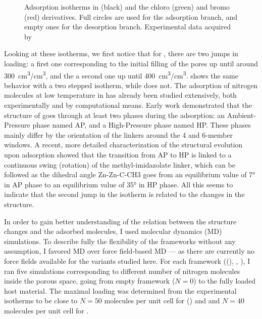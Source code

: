 \documentclass[thesis]{subfiles}
\begin{document}
\begin{figure}[ht]
    \centering
    
    \caption{Adsorption isotherms in  (black) and the chloro (green) and
    bromo (red) derivatives. Full circles are used for the adsorption branch,
    and empty ones for the desorption branch. Experimental data acquired by
    \citeauthor{Chaplais2018}\cite{Chaplais2018}}
    \label{fig:zif8x:isotherms}
\end{figure}

Looking at these isotherms, we first notice that for , there are two jumps
in loading: a first one corresponding to the initial filling of the pores up
until around \SI{300}{cm^3/cm^3}, and the a second one up until
\SI{400}{cm^3/cm^3}. \ZIFCl shows the same behavior with a two stepped isotherm,
while \ZIFBr does not. The adsorption of nitrogen molecules at low temperature
in  has already been studied extensively, both experimentally and by
computational means. Early work demonstrated that the structure of  goes
through at least two phases during the adsorption: an Ambient-Pressure phase
named AP, and a High-Pressure phase named HP. These phases mainly differ by the
orientation of the linkers around the 4 and 6-member
windows.\cite{FairenJimenez2011} A recent, more detailed characterization of the
structural evolution upon adsorption showed that the transition from AP to HP is
linked to a continuous swing (rotation) of the methyl-imidazolate linker, which
can be followed as the dihedral angle Zn-Zn-C-CH3 goes from an equilibrium value
of 7° in AP phase to an equilibrium value of 35° in HP phase.\cite{Coudert2017}
All this seems to indicate that the second jump in the isotherm is related to
the changes in the structure.

In order to gain better understanding of the relation between the structure
changes and the adsorbed molecules, I used molecular dynamics (MD) simulations.
To describe fully the flexibility of the frameworks without any assumption, I
favored \abinitio MD over force field-based MD --- as there are currently no
force fields available for the  variants studied here. For each framework
((), \ZIFCl, \ZIFBr), I ran five simulations corresponding to
different number of nitrogen molecules inside the porous space, going from empty
framework ($N = 0$) to the fully loaded host material. The maximal loading was
determined from the experimental isotherms to be close to $N = 50$ molecules per
unit cell for () and \ZIFCl and $N = 40$ molecules per unit cell
for \ZIFBr.
\end{document}
